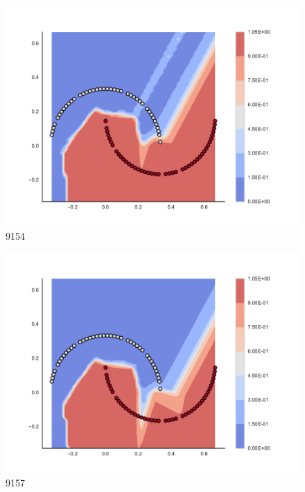 \begin{subfigure}[b]{0.09\textwidth}
    \includegraphics[clip, trim=2.35cm 1.75cm 4.5cm 0cm,width=\textwidth]{img/convergence/9154.pdf}
    \caption{9154}
    \label{fig:convergence_9154}
\end{subfigure}
%
\begin{subfigure}[b]{0.09\textwidth}
    \includegraphics[clip, trim=2.35cm 1.75cm 4.5cm 0cm,width=\textwidth]{img/convergence/9157.pdf}
    \caption{9157}
    \label{fig:convergence_9157}
\end{subfigure}
%

